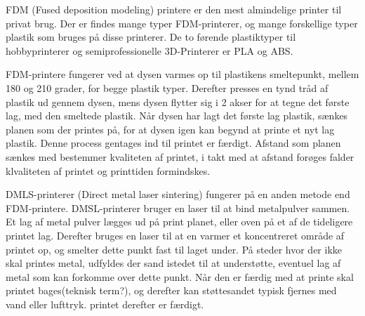 FDM (Fused deposition modeling) printere er den mest almindelige printer til privat brug. Der er findes mange typer FDM-printerer, og mange forskellige typer plastik som bruges på disse printerer. De to førende plastiktyper til hobbyprinterer og semiprofessionelle 3D-Printerer er PLA og ABS.\autocite{3d-guide:_????} 


FDM-printere fungerer ved at dysen varmes op til plastikens smeltepunkt, mellem 180 og 210 grader, for begge plastik typer. Derefter presses en tynd tråd af plastik ud gennem dysen, mens dysen flytter sig i 2 akser for at tegne det første lag, med den smeltede plastik. 
Når dysen har lagt det første lag plastik, sænkes planen som der printes på, for at dysen igen kan begynd at printe et nyt lag plastik. Denne process gentages ind til printet er færdigt. 
Afstand som planen sænkes med bestemmer kvaliteten af printet, i takt med at afstand forøges falder klvaliteten af printet og printtiden formindskes.


DMLS-printerer (Direct metal laser sintering) fungerer på en anden metode end FDM-printere. DMSL-printerer bruger en laser til at bind metalpulver sammen. Et lag af metal pulver lægges ud på print planet, eller oven på et af de tideligere printet lag. Derefter bruges en laser til at en varmer et koncentreret område af printet op, og smelter dette punkt fast til laget under. På steder hvor der ikke skal printes metal, udfyldes der sand istedet til at understøtte, eventuel lag af metal som kan forkomme over dette punkt.\autocite{manyika_disruptive_2013}
Når den er færdig med at printe skal printet bages(teknisk term?), og derefter kan støttesandet typisk fjernes med vand eller lufttryk. printet derefter er færdigt.\autocite{manyika_disruptive_2013}
\newpage



